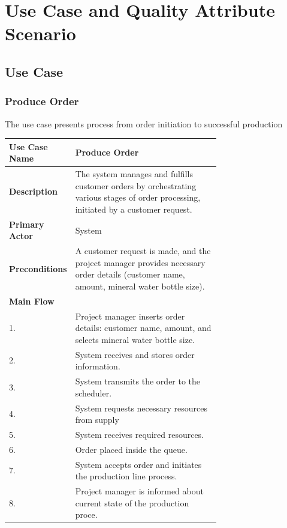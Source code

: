 \documentclass[conference]{IEEEtran}
\begin{document}
\section{Use Case and Quality Attribute Scenario}
\label{sec:use_case_and_qas}

\subsection{Use Case}
\label{sec:use_case}
\subsubsection{\textbf{Produce Order}}

The use case presents process from order initiation to successful production 

\begin{table}[H]
    \centering
    \begin{tabular}{|l|p{0.7\linewidth}|}
        \hline
        \textbf{Use Case Name} & Produce Order \\
        \hline
        \textbf{Description} & The system manages and fulfills customer orders by orchestrating various stages of order processing, initiated by a customer request. \\
        \hline
        \textbf{Primary Actor} & System \\
        \hline
        \textbf{Preconditions} & A customer request is made, and the project manager provides necessary order details (customer name, amount, mineral water bottle size). \\
        \hline
        \textbf{Main Flow} & \\
        1. & Project manager inserts order details: customer name, amount, and selects mineral water bottle size. \\
        2. & System receives and stores order information. \\
        3. & System transmits the order to the scheduler. \\
        4. & System requests necessary resources from supply \\
        5. & System receives required resources. \\
        6. & Order placed inside the queue. \\
        7. & System accepts order and initiates the production line process. \\
        8. & Project manager is informed about current state of the production proce. \\

\end{tabular}
\end{table}
\end{document}
